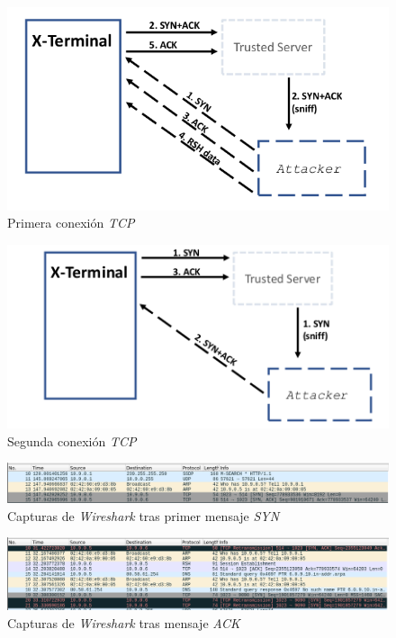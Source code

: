 \documentclass{article}
\begin{document}
\begin{figure}[htpb!]
    \centering
    \includegraphics[scale=0.6]{images/first-tcp-connection.png}
    \caption{Primera conexión \textit{TCP}}
    \label{fig:first-tcp-connection}
\end{figure}

\begin{figure}[htpb!]
    \centering
    \includegraphics[scale=0.6]{images/second-tcp-connection.png}
    \caption{Segunda conexión \textit{TCP}}
    \label{fig:second-tcp-connection}
\end{figure}

\begin{figure}[htpb!]
    \centering
    \includegraphics[scale=0.4]{images/syn-wireshark.png}
    \caption{Capturas de \textit{Wireshark} tras primer mensaje \textit{SYN}}
    \label{fig:syn-wireshark}
\end{figure}

\begin{figure}[htpb!]
    \centering
    \includegraphics[scale=0.4]{images/ack-wireshark.png}
    \caption{Capturas de \textit{Wireshark} tras mensaje \textit{ACK}}
    \label{fig:ack-wireshark}
\end{figure}
\end{document}
